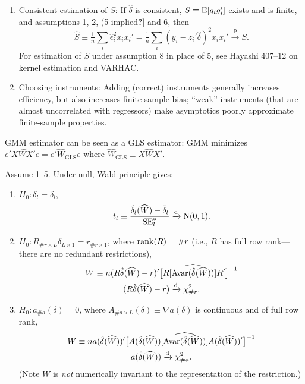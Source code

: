 \documentclass[8pt,letterpaper, landscape]{extarticle} %
\begin{document}
\begin{multicols}{3}
\begin{description}
\begin{enumerate}
\item Consistent estimation of $ S $: If $ \hat{\delta} $ is consistent, $ S \equiv \operatorname{E} [g_i g_{i}' ] $ exists and is finite, and assumptions 1, 2, (5 implied\textbf{?}] and 6, then
$$ \widehat{S} \equiv \tfrac{1}{n} \sum_i \hat{\epsilon}_{i}^{2} x_i x_{i}' = \tfrac{1}{n} \sum_i (y_i - z_{i}' \hat{\delta})^{2} x_i x_{i}' \xrightarrow{\text{p}} S. $$
For estimation of $ S $ under assumption 8 in place of 5, see Hayashi 407--12 on kernel estimation and VARHAC.
\item Choosing instruments: Adding (correct) instruments generally increases efficiency, but also increases finite-sample bias; ``weak'' instruments (that are almost uncorrelated with regressors) make asymptotics poorly approximate finite-sample properties.
\end{enumerate}
GMM estimator can be seen as a GLS estimator: GMM minimizes $ e' X \widehat{W} X' e = e' \widehat{W}_{\text{GLS}} e $ where $ \widehat{W}_{\text{GLS}} \equiv X \widehat{W} X' $.


 Assume 1--5. Under null, Wald principle gives:
\begin{enumerate}
\item $ H_0 \colon \delta_l = \bar{\delta}_l $,
$$ %
t_l \equiv \frac{\hat{\delta}_l (\widehat{W}) - \bar{\delta}_l}{\operatorname{SE}^*_l} \xrightarrow{\text{d}} \n (0,1).
$$ %
\item $ H_0 \colon R_{\# r \times L} \delta_{L \times 1} = r_{\# r \times 1} $, where $ \operatorname{rank} (R) = \# r $ (i.e., $ R $ has full row rank---there are no redundant restrictions),
\begin{multline*}
W \equiv n (R \hat{\delta} (\widehat{W}) - r)' \big [ R [\widehat{\operatorname{Avar} (\hat{\delta}(\widehat{W}))}] R' \big ]^{-1} \\
(R \hat{\delta} (\widehat{W}) - r)
\xrightarrow{\text{d}} \chi^{2}_{\# r}.
\end{multline*}
\item $ H_0 \colon a_{\# a} (\delta) = 0 $, where $ A_{\# a \times L} (\delta) \equiv \nabla a (\delta) $ is continuous and of full row rank,
\begin{multline*}
W \equiv n a(\hat{\delta} (\widehat{W}) )' \big [ A(\hat{\delta} (\widehat{W})) [\widehat{\operatorname{Avar} (\hat{\delta}(\widehat{W}))}] A(\hat{\delta} (\widehat{W}))' \big ]^{-1} \\
a(\hat{\delta} (\widehat{W}) )
\xrightarrow{\text{d}} \chi^{2}_{\# a}.
\end{multline*}
(Note $ W $ is \textit{not} numerically invariant to the representation of the restriction.)
\end{enumerate}


\end{description}
\end{multicols}
\end{document}
